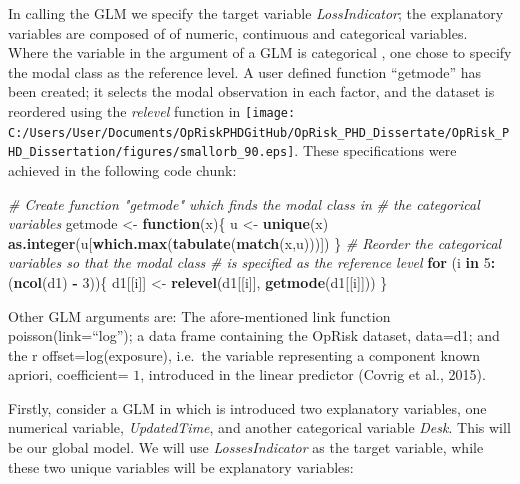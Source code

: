 \documentclass[]{DissertateUSU}
\newenvironment{Shaded}{\begin{snugshade}}{\end{snugshade}}
\newcommand{\KeywordTok}[1]{\textcolor[rgb]{0.13,0.29,0.53}{\textbf{#1}}}
\newcommand{\DecValTok}[1]{\textcolor[rgb]{0.00,0.00,0.81}{#1}}
\newcommand{\StringTok}[1]{\textcolor[rgb]{0.31,0.60,0.02}{#1}}
\newcommand{\CommentTok}[1]{\textcolor[rgb]{0.56,0.35,0.01}{\textit{#1}}}
\newcommand{\ControlFlowTok}[1]{\textcolor[rgb]{0.13,0.29,0.53}{\textbf{#1}}}
\newcommand{\OperatorTok}[1]{\textcolor[rgb]{0.81,0.36,0.00}{\textbf{#1}}}
\newcommand{\NormalTok}[1]{#1}
\begin{document}
\singlespacing

\doublespacing

In calling the GLM we specify the target variable \emph{LossIndicator};
the explanatory variables are composed of of numeric, continuous and
categorical variables. Where the variable in the argument of a GLM is
categorical , one chose to specify the modal class as the reference
level. A user defined function ``getmode'' has been created; it selects
the modal observation in each factor, and the dataset is reordered using
the \emph{relevel} function in
\texttt{[image: C:/Users/User/Documents/OpRiskPHDGitHub/OpRisk\_PHD\_Dissertate/OpRisk\_PHD\_Dissertation/figures/smallorb\_90.eps]}.
These specifications were achieved in the following code chunk:

\singlespacing

\begin{Shaded}
\begin{Highlighting}[]
\CommentTok{# Create function "getmode" which finds the modal class in}
\CommentTok{# the categorical variables}
\NormalTok{getmode <-}\StringTok{ }\ControlFlowTok{function}\NormalTok{(x)\{}
\NormalTok{  u <-}\StringTok{ }\KeywordTok{unique}\NormalTok{(x)}
  \KeywordTok{as.integer}\NormalTok{(u[}\KeywordTok{which.max}\NormalTok{(}\KeywordTok{tabulate}\NormalTok{(}\KeywordTok{match}\NormalTok{(x,u)))])}
\NormalTok{\}}
\CommentTok{# Reorder the categorical variables so that the modal class }
\CommentTok{# is specified as the reference level}
\ControlFlowTok{for}\NormalTok{ (i }\ControlFlowTok{in} \DecValTok{5}\OperatorTok{:}\NormalTok{(}\KeywordTok{ncol}\NormalTok{(d1) }\OperatorTok{-}\StringTok{ }\DecValTok{3}\NormalTok{))\{}
\NormalTok{     d1[[i]] <-}\StringTok{ }\KeywordTok{relevel}\NormalTok{(d1[[i]], }\KeywordTok{getmode}\NormalTok{(d1[[i]]))}
\NormalTok{\}}
\end{Highlighting}
\end{Shaded}

\doublespacing

Other GLM arguments are: The afore-mentioned link function
poisson(link=``log''); a data frame containing the OpRisk dataset,
data=d1; and the r offset=log(exposure), i.e.~the variable representing
a component known apriori, coefficient= \(1\), introduced in the linear
predictor (Covrig et al., 2015).\medskip

Firstly, consider a GLM in which is introduced two explanatory
variables, one numerical variable, \emph{UpdatedTime}, and another
categorical variable \emph{Desk}. This will be our global model. We will
use \emph{LossesIndicator} as the target variable, while these two
unique variables will be explanatory variables:
\end{document}
